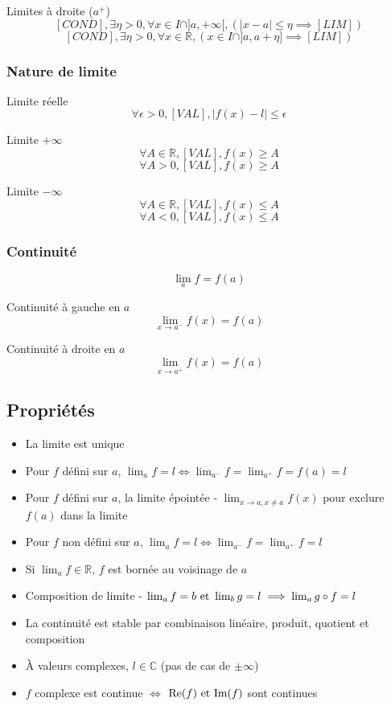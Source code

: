 \documentclass[openany]{book}
\begin{document}
\noindent Limites à droite ($a^+$) 
\[ [COND], \exists \eta > 0, \forall x \in I \cap ] a, + \infty [, (| x - a | \leq \eta \implies [LIM]) \]
\[ [COND], \exists \eta > 0, \forall x \in \mathbb{R}, (x \in I \cap ]a, a + \eta] \implies [LIM]) \]

\subsubsection{Nature de limite}
Limite réelle
\[ \forall \epsilon > 0, [VAL], |f(x) - l| \leq \epsilon \]

\noindent Limite $+ \infty$
\[ \forall A \in \mathbb{R}, [VAL], f(x) \geq A \]
\[ \forall A > 0, [VAL], f(x) \geq A \]

\noindent Limite $- \infty$
\[ \forall A \in \mathbb{R}, [VAL], f(x) \leq A \]
\[ \forall A < 0, [VAL], f(x) \leq A \]

\subsubsection{Continuité}
\[\lim_a f = f(a)\]

\noindent Continuité à gauche en $a$
\[ \lim_{x \rightarrow a^-} f(x) = f(a) \]

\noindent Continuité à droite en $a$
\[ \lim_{x \rightarrow a^+} f(x) = f(a) \]

\subsection{Propriétés}
\begin{itemize}
    \item La limite est unique
    \item Pour $f$ défini sur $a$, $ \lim_a f = l \iff \lim_{a^-} f = \lim_{a^+} f = f(a) = l $
    \item Pour $f$ défini sur $a$, la limite épointée - $ \lim_{x \rightarrow a, x \neq a} f(x) $ pour exclure $f(a)$ dans la limite
    \item Pour $f$ non défini sur $a$, $ \lim_a f = l \iff \lim_{a^-} f = \lim_{a^+} f = l $
    \item Si $\lim_a f \in \mathbb{R}$, $f$ est bornée au voisinage de $a$
    \item Composition de limite - $\lim_a f = b \text{ et } \lim_b g = l \implies \lim_a g \circ f = l $
    \item La continuité est stable par combinaison linéaire, produit, quotient et composition
    \item À valeurs complexes, $l \in \mathbb{C}$ (pas de cas de $\pm \infty$)
    \item $f$ complexe est continue $\iff$ $\text{Re}(f) \text{ et } \text{Im}(f)$ sont continues
\end{itemize}
\end{document}
